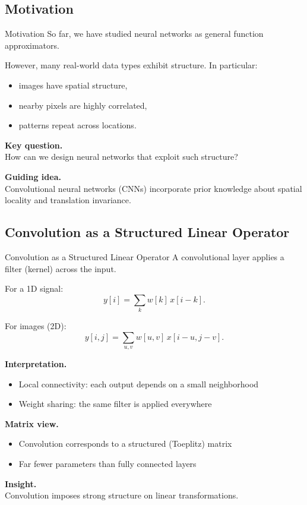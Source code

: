 \documentclass[aspectratio=169,11pt]{beamer}
\begin{document}
\subsection{Motivation}
\begin{frame}[t,allowframebreaks]{Motivation}
\small
So far, we have studied neural networks as general function approximators.

However, many real-world data types exhibit structure. In particular:

\begin{itemize}
    \item images have spatial structure,
    \item nearby pixels are highly correlated,
    \item patterns repeat across locations.
\end{itemize}

\textbf{Key question.}\\ How can we design neural networks that exploit such structure?

\textbf{Guiding idea.}\\ Convolutional neural networks (CNNs) incorporate prior knowledge about spatial locality and translation invariance.
\end{frame}

\subsection{Convolution as a Structured Linear Operator}
\begin{frame}[t,allowframebreaks]{Convolution as a Structured Linear Operator}
\small
A convolutional layer applies a filter (kernel) across the input.

For a 1D signal:
\[
y[i] = \sum_{k} w[k] \, x[i-k].
\]

For images (2D):
\[
y[i,j] = \sum_{u,v} w[u,v] \, x[i-u, j-v].
\]

\textbf{Interpretation.}\\ \begin{itemize}
    \item Local connectivity: each output depends on a small neighborhood
    \item Weight sharing: the same filter is applied everywhere
\end{itemize}

\textbf{Matrix view.}\\ \begin{itemize}
    \item Convolution corresponds to a structured (Toeplitz) matrix
    \item Far fewer parameters than fully connected layers
\end{itemize}

\textbf{Insight.}\\ Convolution imposes strong structure on linear transformations.
\end{frame}
\end{document}

